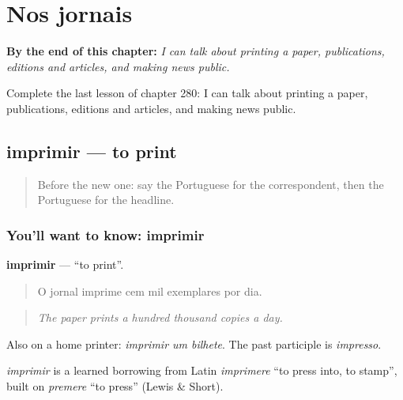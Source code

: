
\chapter{Nos jornais}
\label{ch:pt-nos-jornais}

\begin{chapteropening}
\textbf{By the end of this chapter:} \emph{I can talk about printing a paper, publications, editions and articles, and making news public.}

Complete the last lesson of chapter 280: I can talk about printing a paper, publications, editions and articles, and making news public.
\end{chapteropening}

\section[imprimir]{imprimir — to print}

\label{lesson:PT-C280-imprimir}



\begin{quote}
Before the new one: say the Portuguese for the correspondent, then the Portuguese for the headline.
\end{quote}

\subsection*{You'll want to know: imprimir}
\textbf{imprimir} — \textquotedblleft{}to print\textquotedblright{}.

\begin{quote}
O jornal imprime cem mil exemplares por dia.
\end{quote}

\begin{quote}
\emph{The paper prints a hundred thousand copies a day.}
\end{quote}

Also on a home printer: \emph{imprimir um bilhete}. The past participle is \emph{impresso}.

\begin{cousinweb}
\emph{imprimir} is a learned borrowing from Latin \emph{imprimere} \textquotedblleft{}to press into, to stamp\textquotedblright{}, built on \emph{premere} \textquotedblleft{}to press\textquotedblright{} (Lewis \& Short).
\end{cousinweb}

